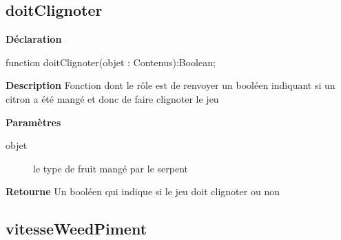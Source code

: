 \documentclass{report}
\newif\ifpdf
\begin{document}
\subsection*{doitClignoter}
\fi
\label{Jouer-doitClignoter}
\begin{list}{}{
\setlength{\itemindent}{0cm}
\setlength{\listparindent}{0cm}
\setlength{\leftmargin}{\evensidemargin}
\addtolength{\leftmargin}{\tmplength}
\settowidth{\labelsep}{X}
\addtolength{\leftmargin}{\labelsep}
\setlength{\labelwidth}{\tmplength}
}
\item[\textbf{Déclaration}\hfill]
\ifpdf
\begin{flushleft}
\fi
\begin{ttfamily}
function doitClignoter(objet : Contenus):Boolean;\end{ttfamily}

\ifpdf
\end{flushleft}
\fi

\par
\item[\textbf{Description}]
Fonction dont le rôle est de renvoyer un booléen indiquant si un citron a été mangé et donc de faire clignoter le jeu  \par
\item[\textbf{Paramètres}]
\begin{description}
\item[objet] le type de fruit mangé par le serpent
\end{description}
\item[\textbf{Retourne}]Un booléen qui indique si le jeu doit clignoter ou non 


\end{list}
\ifpdf
\subsection*{\large{\textbf{vitesseWeedPiment}}\normalsize\hspace{1ex}\hrulefill}
\else
\end{document}
